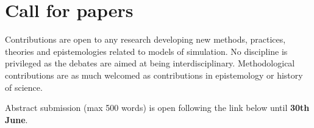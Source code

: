 \documentclass[11pt]{article}
\begin{document}
\section*{Call for papers}

Contributions are open to any research developing new methods, practices, theories and epistemologies related to models of simulation. No discipline is privileged as the debates are aimed at being interdisciplinary. Methodological contributions are as much welcomed as contributions in epistemology or history of science.

\bigskip

\noindent Abstract submission (max 500 words) is open following the link below until \textbf{30th June}.

\end{document}
